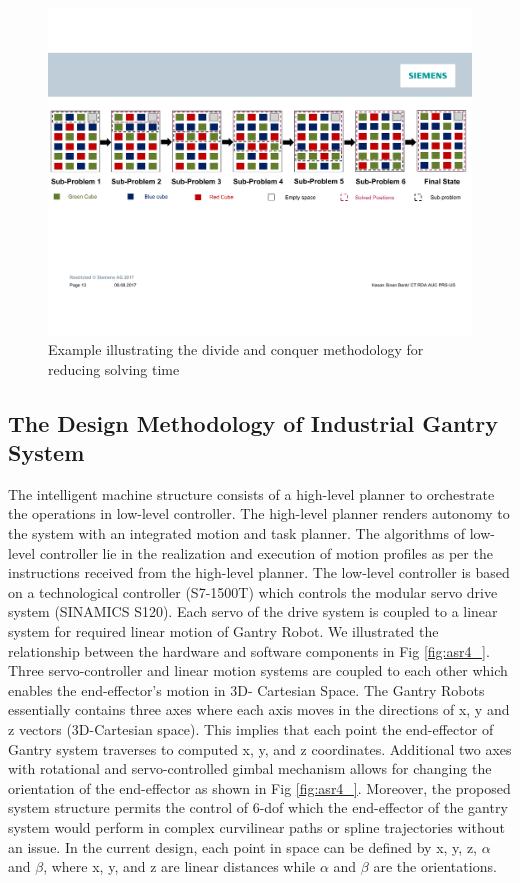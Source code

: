 \documentclass[3p,twocolumn,times,procedia]{elsarticle}
\begin{document}
\begin{figure}[t]
	\centering
	\includegraphics[width=\textwidth]{cropped_divide-conquer.pdf}
	\vspace{-0.1cm}
	\caption{Example illustrating the divide and conquer methodology for reducing solving time}
	\label{fig:divide}
\end{figure}
\subsection{The Design Methodology of Industrial Gantry System}
The intelligent machine structure consists of a high-level planner to orchestrate the operations in low-level controller. The high-level planner renders autonomy to the system with an integrated motion and task planner. The algorithms of low-level controller lie in the realization and execution of motion profiles as per the instructions received from the high-level planner. The low-level controller is based on a technological controller (S7-1500T) which controls the modular servo drive system (SINAMICS S120). Each servo of the drive system is coupled to a linear system for required linear motion of Gantry Robot. We illustrated the relationship between the hardware and software components in Fig \ref{fig:asr4_}. 
Three servo-controller and linear motion systems are coupled to each other which enables the end-effector's motion in 3D- Cartesian Space. The Gantry Robots essentially contains three axes where each axis moves in the directions of x, y and z vectors (3D-Cartesian space). This implies that each point the end-effector of Gantry system traverses to computed x, y, and z coordinates. Additional two axes with rotational and servo-controlled gimbal mechanism allows for changing the orientation of the end-effector as shown in Fig \ref{fig:asr4_}. Moreover, the proposed system structure permits the control of 6-dof which the end-effector of the gantry system would perform in complex curvilinear paths or spline trajectories without an issue. In the current design, each point in space can be defined by x, y, z, ${\alpha}$ and ${\beta}$, where x, y, and z are linear distances while ${\alpha}$ and ${\beta}$ are the orientations.
\end{document}
